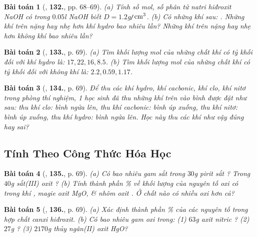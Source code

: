 \documentclass{article}
\numberwithin{equation}{section}
\newtheorem{baitoan}{Bài toán}
\begin{document}
\begin{baitoan}[\cite{An_400_BT_Hoa_Hoc_8_2020}, \textbf{132.}, pp. 68--69]
	(a) Tính số mol, số phân tử natri hiđroxit \emph{NaOH} có trong $0.05$\emph{l NaOH} biết $D = 1.2$\emph{g\texttt{/}$\rm cm^3$}. (b) Có những khí sau: \emph{}. Những khí trên nặng hay nhẹ hơn khí hydro bao nhiêu lần? Những khí trên nặng hay nhẹ hơn không khí bao nhiêu lần?
\end{baitoan}

\begin{baitoan}[\cite{An_400_BT_Hoa_Hoc_8_2020}, \textbf{133.}, p. 69]
	(a) Tìm khối lượng mol của những chất khí có tỷ khối đối với khí hydro là: $17,22,16,8.5$. (b) Tìm khối lượng mol của những chất khí có tỷ khối đối với không khí là: $2.2,0.59,1.17$.
\end{baitoan}

\begin{baitoan}[\cite{An_400_BT_Hoa_Hoc_8_2020}, \textbf{134.}, p. 69]
	Để thu các khí hydro, khí cacbonic, khí clo, khí nitơ trong phòng thí nghiệm, 1 học sinh đã thu những khí trên vào bình được đặt như sau: thu khí clo: bình ngửa lên, thu khí cacbonic: bình úp xuống, thu khí nitơ: bình úp xuống, thu khí hydro: bình ngửa lên. Học này thu các khí như vậy đúng hay sai?
\end{baitoan}

\subsection{Tính Theo Công Thức Hóa Học}

\begin{baitoan}[\cite{An_400_BT_Hoa_Hoc_8_2020}, \textbf{135.}, p. 69]
	(a) Có bao nhiêu gam sắt trong $30$\emph{g} pirit sắt \emph{}? Trong $40$\emph{g} sắt(III) oxit \emph{}? (b) Tính thành phần \% về khối lượng của nguyên tố oxi có trong khí \emph{}, magie oxit \emph{MgO}, \& nhôm oxit \emph{}. Ở chất nào có nhiều oxi hơn cả?
\end{baitoan}

\begin{baitoan}[\cite{An_400_BT_Hoa_Hoc_8_2020}, \textbf{136.}, p. 69]
	(a) Xác định thành phần \% của các nguyên tố trong hợp chất canxi hiđroxit. (b) Có bao nhiêu gam oxi trong: (1) $63$\emph{g} axit nitric \emph{}? (2) $27$\emph{g} \emph{}? (3) $2170$\emph{g} thủy ngân(II) oxit \emph{HgO}?
\end{baitoan}
\end{document}
